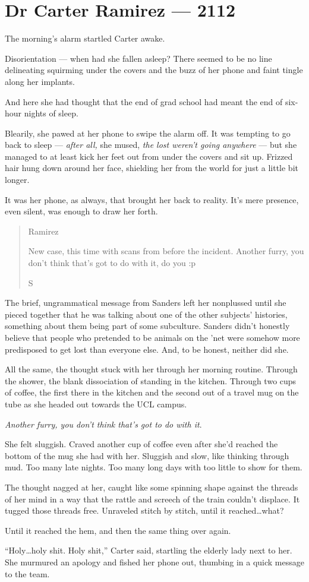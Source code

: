 \hypertarget{dr-carter-ramirez-2112}{%
\chapter*{Dr Carter Ramirez — 2112}\label{dr-carter-ramirez-2112}}

The morning's alarm startled Carter awake.

Disorientation — when had she fallen asleep? There seemed to be no line delineating squirming under the covers and the buzz of her phone and faint tingle along her implants.

And here she had thought that the end of grad school had meant the end of six-hour nights of sleep.

Blearily, she pawed at her phone to swipe the alarm off. It was tempting to go back to sleep — \emph{after all,} she mused, \emph{the lost weren't going anywhere} — but she managed to at least kick her feet out from under the covers and sit up. Frizzed hair hung down around her face, shielding her from the world for just a little bit longer.

It was her phone, as always, that brought her back to reality. It's mere presence, even silent, was enough to draw her forth.

\begin{quote}
Ramirez

New case, this time with scans from before the incident. Another furry, you don't think that's got to do with it, do you :p

S
\end{quote}

The brief, ungrammatical message from Sanders left her nonplussed until she pieced together that he was talking about one of the other subjects' histories, something about them being part of some subculture. Sanders didn't honestly believe that people who pretended to be animals on the 'net were somehow more predisposed to get lost than everyone else. And, to be honest, neither did she.

All the same, the thought stuck with her through her morning routine. Through the shower, the blank dissociation of standing in the kitchen. Through two cups of coffee, the first there in the kitchen and the second out of a travel mug on the tube as she headed out towards the UCL campus.

\emph{Another furry, you don't think that's got to do with it}.

She felt sluggish. Craved another cup of coffee even after she'd reached the bottom of the mug she had with her. Sluggish and slow, like thinking through mud. Too many late nights. Too many long days with too little to show for them.

The thought nagged at her, caught like some spinning shape against the threads of her mind in a way that the rattle and screech of the train couldn't displace. It tugged those threads free. Unraveled stitch by stitch, until it reached\ldots{}what?

Until it reached the hem, and then the same thing over again.

``Holy\ldots{}holy shit. Holy shit,'' Carter said, startling the elderly lady next to her. She murmured an apology and fished her phone out, thumbing in a quick message to the team.
